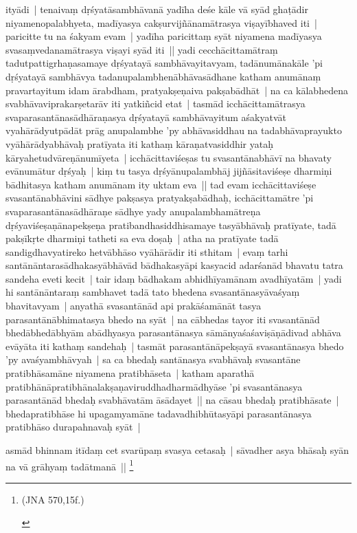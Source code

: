\documentclass[article,12pt,a4paper]{memoir}
\begin{document}
	  \pstart ityādi | tenaivaṃ dṛśyatāsambhāvanā yadīha deśe kāle vā syād ghaṭādir niyamenopalabhyeta, madīyasya cakṣurvijñānamātrasya viṣayībhaved iti | paricitte tu na śakyam evam | yadīha paricittaṃ syāt niyamena madīyasya svasaṃvedanamātrasya viṣayi syād iti || \label{thakur75-146.26} yadi cecchācittamātraṃ tadutpattigrhaṇasamaye dṛśyatayā sambhāvayitavyam, tadānumānakāle 'pi dṛśyatayā sambhāvya tadanupalambhenābhāvasādhane katham anumānaṃ pravartayitum idam ārabdham, pratyakṣeṇaiva pakṣabādhāt | na ca kālabhedena svabhāvaviprakarṣetarāv iti yatkiñcid etat | tasmād icchācittamātrasya svaparasantānasādhāraṇasya dṛśyatayā sambhāvayitum aśakyatvāt vyahārādyutpādāt prāg anupalambhe 'py abhāvasiddhau na tadabhāvaprayukto vyāhārādyabhāvaḥ pratīyata iti kathaṃ kāraṇatvasiddhir yataḥ kāryahetudvāreṇānumīyeta | icchācittaviśeṣas tu svasantānabhāvī na bhavaty evānumātur dṛśyaḥ | kiṃ tu tasya dṛśyānupalambhāj jijñāsitaviśeṣe dharmiṇi bādhitasya katham anumānam ity uktam eva || \label{thakur75-147.1} tad evam icchācittaviśeṣe svasantānabhāvini sādhye pakṣasya pratyakṣabādhaḥ, icchācittamātre 'pi svaparasantānasādhāraṇe sādhye yady anupalambhamātreṇa dṛśyaviśeṣaṇānapekṣeṇa pratibandhasiddhisamaye tasyābhāvaḥ pratīyate, tadā pakṣīkṛte dharmiṇi tatheti sa eva doṣaḥ | atha na pratīyate tadā sandigdhavyatireko hetvābhāso vyāhārādir iti sthitam | \label{thakur75-147.6} evaṃ tarhi santānāntarasādhakasyābhāvād bādhakasyāpi kasyacid adarśanād bhavatu tatra sandeha eveti kecit | tair idaṃ bādhakam abhidhīyamānam avadhīyatām | yadi hi santānāntaraṃ sambhavet tadā tato bhedena svasantānasyāvaśyaṃ bhavitavyam | anyathā svasantānād api prakāśamānāt tasya parasantānābhimatasya bhedo na syāt | na cābhedas tayor iti svasantānād bhedābhedābhyām abādhyasya parasantānasya sāmānyaśaśaviṣāṇādivad abhāva evāyāta iti kathaṃ sandehaḥ | tasmāt parasantānāpekṣayā svasantānasya bhedo 'py avaśyambhāvyah | sa ca bhedaḥ santānasya svabhāvaḥ svasantāne pratibhāsamāne niyamena pratibhāseta | katham aparathā pratibhānāpratibhānalakṣaṇaviruddhadharmādhyāse 'pi svasantānasya parasantānād bhedaḥ svabhāvatām āsādayet || \label{thakur75-147.15} na cāsau bhedaḥ pratibhāsate | bhedapratibhāse hi upagamyamāne tadavadhibhūtasyāpi parasantānasya pratibhāso durapahnavaḥ syāt |
	\pend
      

	  \pstart asmād bhinnam itīdaṃ cet svarūpaṃ svasya cetasaḥ | sāvadher asya bhāsaḥ syān na vā grāhyaṃ tadātmanā || \footnote{\begin{english}(JNA 570,15f.)\end{english}}
	\pend
      
\end{document}
